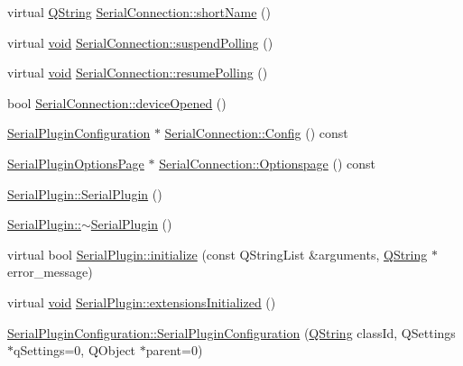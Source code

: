 \begin{DoxyCompactItemize}
\item 
virtual \hyperlink{group___u_a_v_objects_plugin_gab9d252f49c333c94a72f97ce3105a32d}{\-Q\-String} \hyperlink{group___serial_plugin_ga6783c4f6c9faa91aeb0b91fef726a2d4}{\-Serial\-Connection\-::short\-Name} ()
\item 
virtual \hyperlink{group___u_a_v_objects_plugin_ga444cf2ff3f0ecbe028adce838d373f5c}{void} \hyperlink{group___serial_plugin_ga9616a4134ceba88c6ae5820e29a783c4}{\-Serial\-Connection\-::suspend\-Polling} ()
\item 
virtual \hyperlink{group___u_a_v_objects_plugin_ga444cf2ff3f0ecbe028adce838d373f5c}{void} \hyperlink{group___serial_plugin_gac4a001507836025006728ab1771116f0}{\-Serial\-Connection\-::resume\-Polling} ()
\item 
bool \hyperlink{group___serial_plugin_gaa9616a7f264a903a0a5b13ae05d40375}{\-Serial\-Connection\-::device\-Opened} ()
\item 
\hyperlink{class_serial_plugin_configuration}{\-Serial\-Plugin\-Configuration} $\ast$ \hyperlink{group___serial_plugin_gad054f24566a90754595ad08e00756bfc}{\-Serial\-Connection\-::\-Config} () const 
\item 
\hyperlink{class_serial_plugin_options_page}{\-Serial\-Plugin\-Options\-Page} $\ast$ \hyperlink{group___serial_plugin_gaf86b9d4296b2b9e6429dd643fd113861}{\-Serial\-Connection\-::\-Optionspage} () const 
\item 
\hyperlink{group___serial_plugin_ga61918aa34cb91654613f5ae3e2992cb5}{\-Serial\-Plugin\-::\-Serial\-Plugin} ()
\item 
\hyperlink{group___serial_plugin_gaed0afbd615d41b58d07b4916f4c9e277}{\-Serial\-Plugin\-::$\sim$\-Serial\-Plugin} ()
\item 
virtual bool \hyperlink{group___serial_plugin_ga06e1847534162b254c0790b2221e2836}{\-Serial\-Plugin\-::initialize} (const \-Q\-String\-List \&arguments, \hyperlink{group___u_a_v_objects_plugin_gab9d252f49c333c94a72f97ce3105a32d}{\-Q\-String} $\ast$error\-\_\-message)
\item 
virtual \hyperlink{group___u_a_v_objects_plugin_ga444cf2ff3f0ecbe028adce838d373f5c}{void} \hyperlink{group___serial_plugin_ga513ef44cd1747f6859255f102fc9f845}{\-Serial\-Plugin\-::extensions\-Initialized} ()
\item 
\hyperlink{group___serial_plugin_ga15a723a8f3215c718070ef32ea6fff2e}{\-Serial\-Plugin\-Configuration\-::\-Serial\-Plugin\-Configuration} (\hyperlink{group___u_a_v_objects_plugin_gab9d252f49c333c94a72f97ce3105a32d}{\-Q\-String} class\-Id, \-Q\-Settings $\ast$q\-Settings=0, \-Q\-Object $\ast$parent=0)

\end{DoxyCompactItemize}
